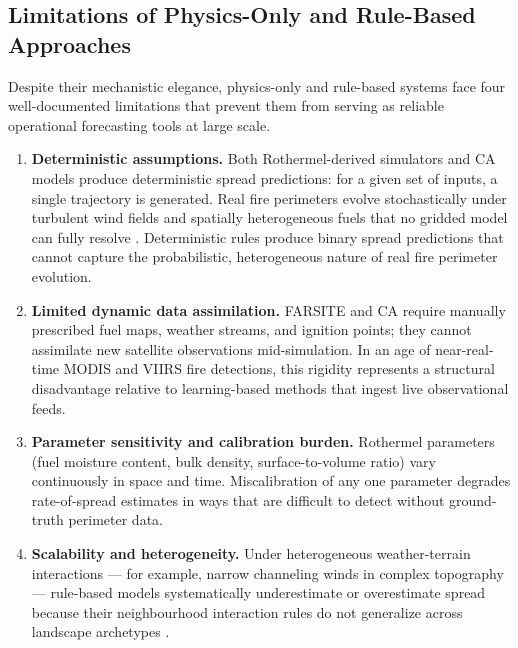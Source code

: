 \subsection{Limitations of Physics-Only and Rule-Based Approaches}

Despite their mechanistic elegance, physics-only and rule-based systems face four well-documented limitations that prevent them from serving as reliable operational forecasting tools at large scale.

\begin{enumerate}
    \item \textbf{Deterministic assumptions.}
          Both Rothermel-derived simulators and CA models produce deterministic spread predictions: for a given set of inputs, a single trajectory is generated.
          Real fire perimeters evolve stochastically under turbulent wind fields and spatially heterogeneous fuels that no gridded model can fully resolve \citep{singh2024physmlreview}.
          Deterministic rules produce binary spread predictions that cannot capture the probabilistic, heterogeneous nature of real fire perimeter evolution.

    \item \textbf{Limited dynamic data assimilation.}
          FARSITE and CA require manually prescribed fuel maps, weather streams, and ignition points; they cannot assimilate new satellite observations mid-simulation.
          In an age of near-real-time MODIS and VIIRS fire detections, this rigidity represents a structural disadvantage relative to learning-based methods that ingest live observational feeds.

    \item \textbf{Parameter sensitivity and calibration burden.}
          Rothermel parameters (fuel moisture content, bulk density, surface-to-volume ratio) vary continuously in space and time.
          Miscalibration of any one parameter degrades rate-of-spread estimates in ways that are difficult to detect without ground-truth perimeter data.

    \item \textbf{Scalability and heterogeneity.}
          Under heterogeneous weather-terrain interactions — for example, narrow channeling winds in complex topography — rule-based models systematically underestimate or overestimate spread because their neighbourhood interaction rules do not generalize across landscape archetypes \citep{singh2024physmlreview}.
\end{enumerate}

